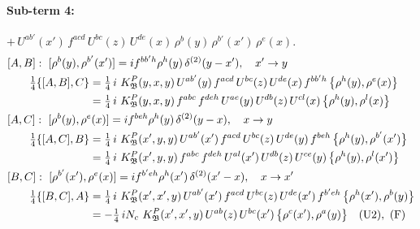 \documentclass[10pt]{article}
\numberwithin{equation}{section}
\begin{document}
\paragraph{Sub-term 4:} $+\,U^{ab'}(x')\,f^{acd}\,U^{bc}(z)\,U^{de}(x)\,\rho^{b}(y)\,\rho^{b'}(x')\,\rho^{e}(x)$.
\begin{align}
&[A,B]:\ [\rho^{b}(y),\rho^{b'}(x')]=i f^{bb'h}\rho^{h}(y)\,\delta^{(2)}(y-x'),\quad x'\to y\notag\\
&\qquad \tfrac14\{[A,B],C\}=\tfrac14\,i\,\,K^{P}_{\mathfrak B}(y,x,y)\,U^{ab'}(y)\,f^{acd}\,U^{bc}(z)\,U^{de}(x)\,f^{bb'h}\,\big\{\rho^{h}(y),\rho^{e}(x)\big\}\notag\\
&\qquad\phantom{\tfrac14\{[A,B],C\}}=\tfrac14\,i\,\,K^{P}_{\mathfrak B}(y,x,y)\,f^{abc}\,f^{deh}\,U^{ae}(y)\,U^{db}(z)\,U^{cl}(x)\,\big\{\rho^{h}(y),\rho^{l}(x)\big\}
\label{eq:GIII.II.P-4-AB}\\
&[A,C]:\ [\rho^{b}(y),\rho^{e}(x)]=i f^{beh}\rho^{h}(y)\,\delta^{(2)}(y-x),\quad x\to y\notag\\
&\qquad \tfrac14\{[A,C],B\}=\tfrac14\,i\,\,K^{P}_{\mathfrak B}(x',y,y)\,U^{ab'}(x')\,f^{acd}\,U^{bc}(z)\,U^{de}(y)\,f^{beh}\,\big\{\rho^{h}(y),\rho^{b'}(x')\big\}\notag\\
&\qquad\phantom{\tfrac14\{[A,C],B\}}=\tfrac14\,i\,\,K^{P}_{\mathfrak B}(x',y,y)\,f^{abc}\,f^{deh}\,U^{al}(x')\,U^{db}(z)\,U^{ce}(y)\,\big\{\rho^{h}(y),\rho^{l}(x')\big\}
\label{eq:GIII.II.P-4-AC}\\
&[B,C]:\ [\rho^{b'}(x'),\rho^{e}(x)]=i f^{b'eh}\rho^{h}(x')\,\delta^{(2)}(x'-x),\quad x\to x'\notag\\
&\qquad \tfrac14\{[B,C],A\}=\tfrac14\,i\,\,K^{P}_{\mathfrak B}(x',x',y)\,U^{ab'}(x')\,f^{acd}\,U^{bc}(z)\,U^{de}(x')\,f^{b'eh}\,\big\{\rho^{h}(x'),\rho^{b}(y)\big\}\notag\\
&\qquad\phantom{\tfrac14\{[B,C],A\}}=-\tfrac14\,i N_{c}\,\,K^{P}_{\mathfrak B}(x',x',y)\,U^{ab}(z)\,U^{bc}(x')\,\big\{\rho^{c}(x'),\rho^{a}(y)\big\}\quad\text{(U2)},\ \text{(F)}
\label{eq:GIII.II.P-4-BC}
\end{align}
\end{document}
